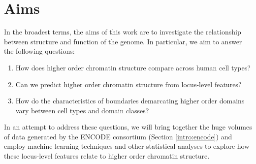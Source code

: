 \documentclass[a4paper,11pt,oneside]{book}
\begin{document}





\section{Aims}

In the broadest terms, the aims of this work are to investigate the relationship between structure and function of the genome. In particular, we aim to answer the following questions: 
\begin{enumerate}
\item How does higher order chromatin structure compare across human cell types?
\item Can we predict higher order chromatin structure from locus-level features?
\item How do the characteristics of boundaries demarcating higher order domains vary between cell types and domain classes?
\end{enumerate}

In an attempt to address these questions, we will bring together the huge volumes of data generated by the ENCODE consortium (Section \ref{intro:encode}) and employ machine learning techniques and other statistical analyses to explore how these locus-level features relate to higher order chromatin structure. 

\ifstandalone
\begin{small}

\end{small}
\fi
\end{document}
